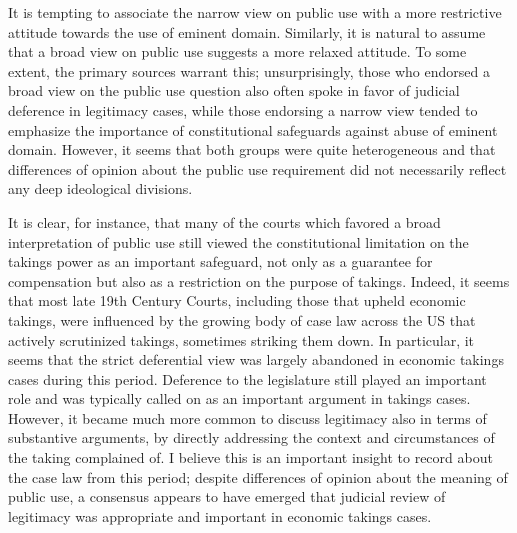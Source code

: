 \documentclass[12pt,a4paper]{book} %
\begin{document}

It is tempting to associate the narrow view on public use with a more restrictive attitude towards the use of eminent domain. Similarly, it is natural to assume that a broad view on public use suggests a more relaxed attitude. To some extent, the primary sources warrant this; unsurprisingly, those who endorsed a broad view on the public use question also often spoke in favor of judicial deference in legitimacy cases, while those endorsing a narrow view tended to emphasize the importance of constitutional safeguards against abuse of eminent domain. However, it seems that both groups were quite heterogeneous and that differences of opinion about the public use requirement did not necessarily reflect any deep ideological divisions.

It is clear, for instance, that many of the courts which favored a broad interpretation of public use still viewed the constitutional limitation on the takings power as an important safeguard, not only as a guarantee for compensation but also as a restriction on the purpose of takings. Indeed, it seems that most late 19th Century Courts, including those that upheld economic takings, were influenced by the growing body of case law across the US that actively scrutinized takings, sometimes striking them down. In particular, it seems that the strict deferential view was largely abandoned in economic takings cases during this period. Deference to the legislature still played an important role and was typically called on as an important argument in takings cases. However, it became much more common to discuss legitimacy also in terms of substantive arguments, by directly addressing the context and circumstances of the taking complained of. I believe this is an important insight to record about the case law from this period; despite differences of opinion about the meaning of public use, a consensus appears to have emerged that judicial review of legitimacy was appropriate and important in economic takings cases.
\end{document}
